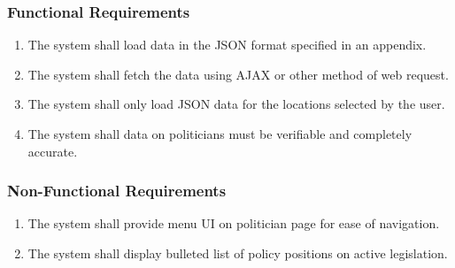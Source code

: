 \documentclass{beamer}
\newcommand{\requirement}[1]{The system shall #1.}
\begin{document}
\begin{frame}
  \frametitle{Functional Requirements}
  \begin{enumerate}
    \item \requirement{load data in the JSON format specified in
      an appendix}
    \item \requirement{fetch the data using AJAX or other method of web request}
    \item \requirement{only load JSON data for the locations selected
      by the user}
    \item \requirement{data on politicians must be verifiable and completely accurate}
  \end{enumerate}
\end{frame}

\begin{frame}
  \frametitle{Non-Functional Requirements}
  \begin{enumerate}
    \item \requirement{provide menu UI on politician page for ease of navigation}
    \item \requirement{display bulleted list of policy positions on active legislation}
  \end{enumerate}
\end{frame}
\end{document}
